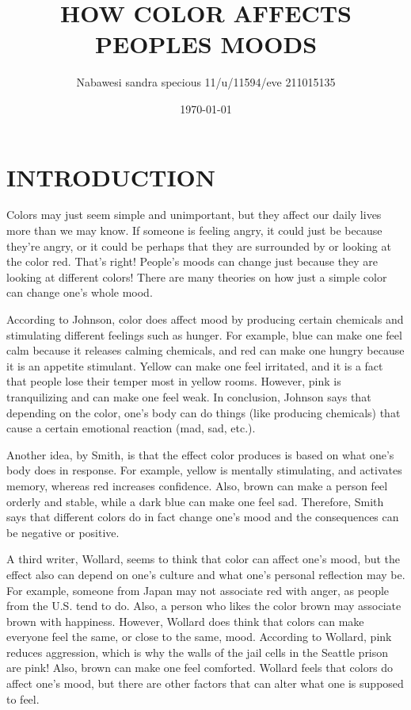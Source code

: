 \documentclass[11pt]{book}              %
\title{\bf HOW COLOR AFFECTS PEOPLES MOODS}    %
\author{ Nabawesi sandra specious 11/u/11594/eve 211015135}
\date{\today}                           %
\begin{document}
\frontmatter                            %
\maketitle                              %
                  
\tableofcontents

\section{INTRODUCTION}
Colors may just seem simple and unimportant, but they affect our daily lives more than we may know. If someone is feeling angry, it could just be because they’re angry, or it could be perhaps that they are surrounded by or looking at the color red. That’s right! People’s moods can change just because they are looking at different colors! There are many theories on how just a simple color can change one’s whole mood.

 According to Johnson, color does affect mood by producing certain chemicals and stimulating different feelings such as hunger. For example, blue can make one feel calm because it releases calming chemicals, and red can make one hungry because it is an appetite stimulant. Yellow can make one feel irritated, and it is a fact that people lose their temper most in yellow rooms. However, pink is tranquilizing and can make one feel weak. In conclusion, Johnson says that depending on the color, one’s body can do things (like producing chemicals) that cause a certain emotional reaction (mad, sad, etc.). 

Another idea, by Smith, is that the effect color produces is based on what one’s body does in response. For example, yellow is mentally stimulating, and activates memory, whereas red increases confidence. Also, brown can make a person feel orderly and stable, while a dark blue can make one feel sad. Therefore, Smith says that different colors do in fact change one’s mood and the consequences can be negative or positive. 

A third writer, Wollard, seems to think that color can affect one’s mood, but the effect also can depend on one’s culture and what one’s personal reflection may be. For example, someone from Japan may not associate red with anger, as people from the U.S. tend to do. Also, a person who likes the color brown may associate brown with happiness. However, Wollard does think that colors can make everyone feel the same, or close to the same, mood. According to Wollard, pink reduces aggression, which is why the walls of the jail cells in the Seattle prison are pink! Also, brown can make one feel comforted. Wollard feels that colors do affect one’s mood, but there are other factors that can alter what one is supposed to feel. 
\end{document}
